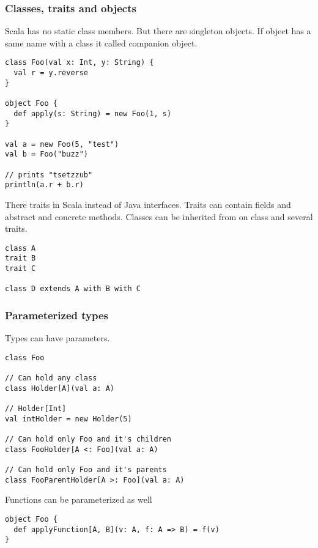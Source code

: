 \documentclass{beamer}
\begin{document}
\begin{frame}[fragile]
\frametitle{Classes, traits and objects}

Scala has no static class members. But there are singleton objects. If object has a same name with a class it called companion object.

\begin{lstlisting}
class Foo(val x: Int, y: String) {
  val r = y.reverse
}

object Foo {
  def apply(s: String) = new Foo(1, s)
}

val a = new Foo(5, "test")
val b = Foo("buzz")

// prints "tsetzzub"
println(a.r + b.r)
\end{lstlisting}

There traits in Scala instead of Java interfaces. Traits can contain fields and abstract and concrete methods. Classes can be inherited from on class and several traits.

\begin{lstlisting}
class A
trait B
trait C

class D extends A with B with C
\end{lstlisting}

\end{frame}

\begin{frame}[fragile]
\frametitle{Parameterized types}

Types can have parameters.

\begin{lstlisting}
class Foo

// Can hold any class
class Holder[A](val a: A)

// Holder[Int]
val intHolder = new Holder(5)

// Can hold only Foo and it's children
class FooHolder[A <: Foo](val a: A)

// Can hold only Foo and it's parents
class FooParentHolder[A >: Foo](val a: A)
\end{lstlisting}

Functions can be parameterized as well

\begin{lstlisting}
object Foo {
  def applyFunction[A, B](v: A, f: A => B) = f(v)
}
\end{lstlisting}

\end{frame}
\end{document}
